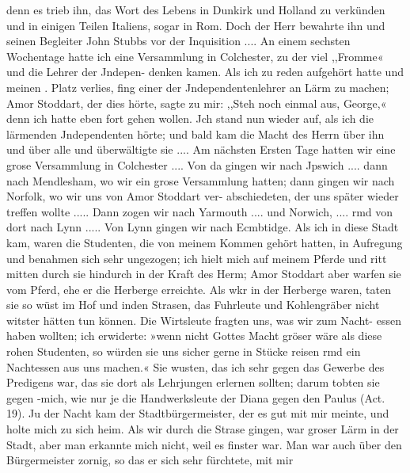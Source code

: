 denn es trieb ihn, das Wort des Lebens in Dunkirk und Holland
zu verkünden und in einigen Teilen Italiens, sogar in Rom.
Doch der Herr bewahrte ihn und seinen Begleiter John Stubbs
vor der Inquisition ....
An einem sechsten Wochentage hatte ich eine Versammlung
in Colchester, zu der viel ,,Fromme« und die Lehrer der Jndepen-
denken kamen. Als ich zu reden aufgehört hatte und meinen
. Platz verlies, fing einer der Jndependentenlehrer an Lärm zu
machen; Amor Stoddart, der dies hörte, sagte zu mir: ,,Steh
noch einmal aus, George,« denn ich hatte eben fort gehen wollen.
Jch stand nun wieder auf, als ich die lärmenden Jndependenten
hörte; und bald kam die Macht des Herrn über ihn und über
alle und überwältigte sie ....
Am nächsten Ersten Tage hatten wir eine grose Versammlung
in Colchester .... Von da gingen wir nach Jpswich .... dann
nach Mendlesham, wo wir ein grose Versammlung hatten; dann
gingen wir nach Norfolk, wo wir uns von Amor Stoddart ver-
abschiedeten, der uns später wieder treffen wollte ..... Dann
zogen wir nach Yarmouth .... und Norwich, .... rmd von
dort nach Lynn ..... Von Lynn gingen wir nach Ecmbtidge.
Als ich in diese Stadt kam, waren die Studenten, die von
meinem Kommen gehört hatten, in Aufregung und benahmen
sich sehr ungezogen; ich hielt mich auf meinem Pferde und ritt
mitten durch sie hindurch in der Kraft des Herm; Amor Stoddart
aber warfen sie vom Pferd, ehe er die Herberge erreichte. Als
wkr in der Herberge waren, taten sie so wüst im Hof und inden
Strasen, das Fuhrleute und Kohlengräber nicht witster hätten
tun können. Die Wirtsleute fragten uns, was wir zum Nacht-
essen haben wollten; ich erwiderte: »wenn nicht Gottes Macht
gröser wäre als diese rohen Studenten, so würden sie uns sicher
gerne in Stücke reisen rmd ein Nachtessen aus uns machen.« Sie
wusten, das ich sehr gegen das Gewerbe des Predigens war, das
sie dort als Lehrjungen erlernen sollten; darum tobten sie gegen
-mich, wie nur je die Handwerksleute der Diana gegen den Paulus
(Act. 19). Ju der Nacht kam der Stadtbürgermeister, der es gut
mit mir meinte, und holte mich zu sich heim. Als wir durch
die Strase gingen, war groser Lärm in der Stadt, aber man
erkannte mich nicht, weil es finster war. Man war auch über
den Bürgermeister zornig, so das er sich sehr fürchtete, mit mir


